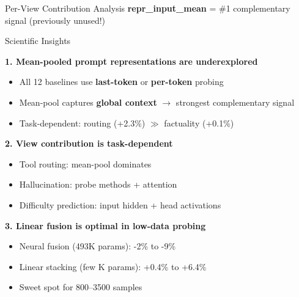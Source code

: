 \documentclass[aspectratio=169,14pt]{beamer}
\begin{document}
\begin{frame}{Per-View Contribution Analysis}
\vspace{0.5em}
\centering
{\small \textcolor{primary}{\textbf{repr\_input\_mean}} = \#1 complementary signal (previously unused!)}

\end{frame}

\begin{frame}{Scientific Insights}

\textbf{1. Mean-pooled prompt representations are underexplored}
\begin{itemize}
    \item All 12 baselines use \textbf{last-token} or \textbf{per-token} probing
    \item Mean-pool captures \textbf{global context} $\rightarrow$ strongest complementary signal
    \item Task-dependent: routing (+2.3\%) $\gg$ factuality (+0.1\%)
\end{itemize}

\vspace{0.8em}
\textbf{2. View contribution is task-dependent}
\begin{itemize}
    \item Tool routing: mean-pool dominates
    \item Hallucination: probe methods + attention
    \item Difficulty prediction: input hidden + head activations
\end{itemize}

\vspace{0.8em}
\textbf{3. Linear fusion is optimal in low-data probing}
\begin{itemize}
    \item Neural fusion (493K params): \textcolor{losered}{-2\% to -9\%}
    \item Linear stacking (few K params): \textcolor{wingreen}{+0.4\% to +6.4\%}
    \item Sweet spot for 800--3500 samples
\end{itemize}

\end{frame}
\end{document}
